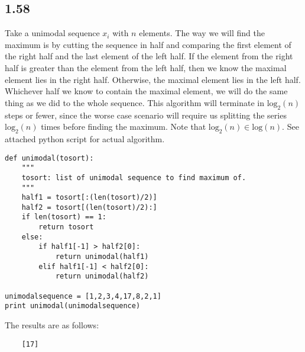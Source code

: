 \documentclass[letterpaper,12pt]{article}
\theoremstyle{definition}
\begin{document}
\subsection*{1.58}
Take a unimodal sequence $x_i$ with $n$ elements. The way we will find the maximum is by cutting the sequence in half and comparing the first element of the right half and the last element of the left half. If the element from the right half is greater than the element from the left half, then we know the maximal element lies in the right half. Otherwise, the maximal element lies in the left half. Whichever half we know to contain the maximal element, we will do the same thing as we did to the whole sequence. This algorithm will terminate in $\text{log}_2 (n)$ steps or fewer, since the worse case scenario will require us splitting the series $\text{log}_2 (n) $ times before finding the maximum. Note that $\text{log}_2 (n) \in \text{log} (n) $.
See attached python script for actual algorithm.

\pagebreak
\begin{lstlisting}
def unimodal(tosort):
    """
    tosort: list of unimodal sequence to find maximum of.
    """
    half1 = tosort[:(len(tosort)/2)]
    half2 = tosort[(len(tosort)/2):]
    if len(tosort) == 1:
        return tosort
    else:
        if half1[-1] > half2[0]:
            return unimodal(half1) 
        elif half1[-1] < half2[0]:
            return unimodal(half2)

unimodalsequence = [1,2,3,4,17,8,2,1]
print unimodal(unimodalsequence)
\end{lstlisting}
The results are as follows:
\begin{lstlisting}
    [17]
\end{lstlisting}
\end{document}
